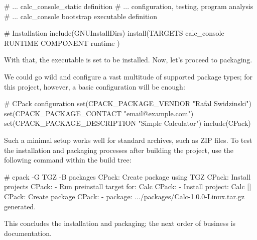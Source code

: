 \begin{cmake}
# ... calc_console_static definition
# ... configuration, testing, program analysis
# ... calc_console bootstrap executable definition

# Installation
include(GNUInstallDirs)
install(TARGETS calc_console
    RUNTIME COMPONENT runtime
)
\end{cmake}

With that, the executable is set to be installed. Now, let’s proceed to packaging.


We could go wild and configure a vast multitude of supported package types; for this project, however, a basic configuration will be enough:


\begin{cmake}
# CPack configuration
set(CPACK_PACKAGE_VENDOR "Rafal Swidzinski")
set(CPACK_PACKAGE_CONTACT "email@example.com")
set(CPACK_PACKAGE_DESCRIPTION "Simple Calculator")
include(CPack)
\end{cmake}

Such a minimal setup works well for standard archives, such as ZIP files. To test the installation and packaging processes after building the project, use the following command within the build tree:

\begin{shell}
# cpack -G TGZ -B packages
CPack: Create package using TGZ
CPack: Install projects
CPack: - Run preinstall target for: Calc
CPack: - Install project: Calc []
CPack: Create package
CPack: - package: .../packages/Calc-1.0.0-Linux.tar.gz generated.
\end{shell}

This concludes the installation and packaging; the next order of business is documentation.















